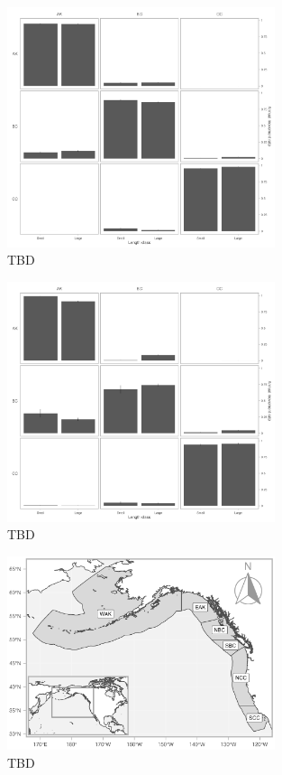 \documentclass{article}
\begin{document}
\begin{figure}[htb]
    \centering
    \includegraphics[width = 0.7\textwidth]{bar-regions-3-size-no-duration-constraint}
    \caption{TBD}
    \label{fig:bar-regions-3-size-no-duration-constraint}
\end{figure}

\begin{figure}[htb]
    \centering
    \includegraphics[width = 0.7\textwidth]{bar-regions-3-size-no-recovery-transition}
    \caption{TBD}
    \label{fig:bar-regions-3-size-no-recovery-transition}
\end{figure}

\begin{figure}[htb]
    \centering
    \includegraphics[width = 0.7\textwidth]{map-regions-6}
    \caption{TBD}
    \label{fig:map-regions-6}
\end{figure}
\end{document}
